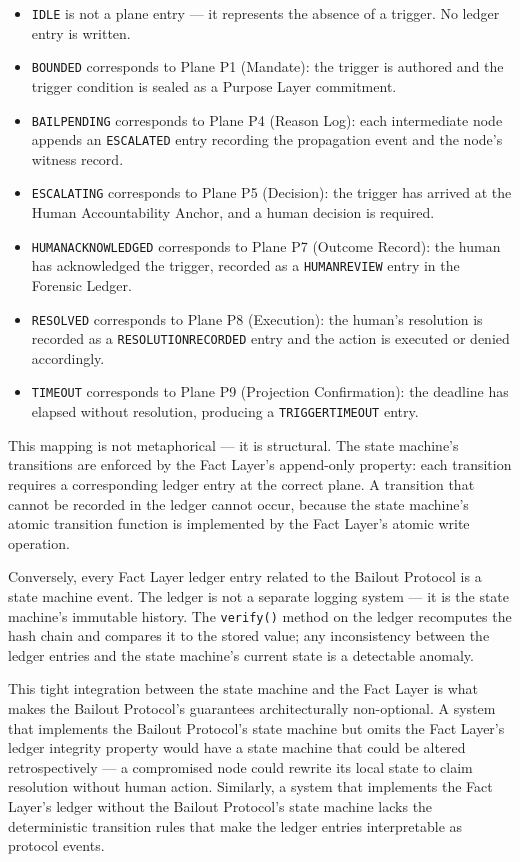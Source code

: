 \begin{itemize}
  \item \texttt{IDLE} is not a plane entry --- it represents the absence of a trigger. No ledger entry is written.
  \item \texttt{BOUNDED} corresponds to Plane P1 (Mandate): the trigger is authored and the trigger condition is sealed as a Purpose Layer commitment.
  \item \texttt{BAIL\textunderscore PENDING} corresponds to Plane P4 (Reason Log): each intermediate node appends an \texttt{ESCALATED} entry recording the propagation event and the node's witness record.
  \item \texttt{ESCALATING} corresponds to Plane P5 (Decision): the trigger has arrived at the Human Accountability Anchor, and a human decision is required.
  \item \texttt{HUMAN\textunderscore ACKNOWLEDGED} corresponds to Plane P7 (Outcome Record): the human has acknowledged the trigger, recorded as a \texttt{HUMAN\textunderscore REVIEW} entry in the Forensic Ledger.
  \item \texttt{RESOLVED} corresponds to Plane P8 (Execution): the human's resolution is recorded as a \texttt{RESOLUTION\textunderscore RECORDED} entry and the action is executed or denied accordingly.
  \item \texttt{TIMEOUT} corresponds to Plane P9 (Projection Confirmation): the deadline has elapsed without resolution, producing a \texttt{TRIGGER\textunderscore TIMEOUT} entry.
\end{itemize}

This mapping is not metaphorical --- it is structural. The state machine's transitions are enforced by the Fact Layer's append-only property: each transition requires a corresponding ledger entry at the correct plane. A transition that cannot be recorded in the ledger cannot occur, because the state machine's atomic transition function is implemented by the Fact Layer's atomic write operation.

Conversely, every Fact Layer ledger entry related to the Bailout Protocol is a state machine event. The ledger is not a separate logging system --- it is the state machine's immutable history. The \texttt{verify()} method on the ledger recomputes the hash chain and compares it to the stored value; any inconsistency between the ledger entries and the state machine's current state is a detectable anomaly.

This tight integration between the state machine and the Fact Layer is what makes the Bailout Protocol's guarantees architecturally non-optional. A system that implements the Bailout Protocol's state machine but omits the Fact Layer's ledger integrity property would have a state machine that could be altered retrospectively --- a compromised node could rewrite its local state to claim resolution without human action. Similarly, a system that implements the Fact Layer's ledger without the Bailout Protocol's state machine lacks the deterministic transition rules that make the ledger entries interpretable as protocol events.

